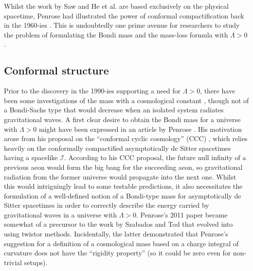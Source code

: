 \documentclass[aps,pre,preprint,superscriptaddress,showpacs,showkeys]{revtex4-1}
\begin{document}
Whilst the work by Saw and He et al. are based exclusively on the physical spacetime, Penrose had illustrated the power of conformal compactification back in the 1960-ies \cite{heledi,pen11}. This is undoubtedly one prime avenue for researchers to study the problem of formulating the Bondi mass and the mass-loss formula with $\Lambda>0$.

\subsection{Conformal structure}\label{Section1B}

Prior to the discovery in the 1990-ies supporting a need for $\Lambda>0$, there have been some investigations of the mass with a cosmological constant \cite{AD,AD2}, though not of a Bondi-Sachs type that would decrease when an isolated system radiates gravitational waves. A first clear desire to obtain the Bondi mass for a universe with $\Lambda>0$ might have been expressed in an article by Penrose \cite{Pen2011}. His motivation arose from his proposal on the ``conformal cyclic cosmology'' (CCC) \cite{Pen2010}, which relies heavily on the conformally compactified asymptotically de Sitter spacetimes having a spacelike $\mathcal{I}$. According to his CCC proposal, the future null infinity of a previous aeon would form the big bang for the succeeding aeon, so gravitational radiation from the former universe would propagate into the next one. Whilst this would intriguingly lead to some testable predictions, it also necessitates the formulation of a well-defined notion of a Bondi-type mass for asymptotically de Sitter spacetimes in order to correctly describe the energy carried by gravitational waves in a universe with $\Lambda>0$. Penrose's 2011 paper became somewhat of a precursor to the work by Szabados and Tod \cite{Szabados} that evolved into using twistor methods. Incidentally, the latter demonstrated that Penrose's suggestion for a definition of a cosmological mass based on a charge integral of curvature \cite{Pen2011} does not have the ``rigidity property'' (so it could be zero even for non-trivial setups).
\end{document}
